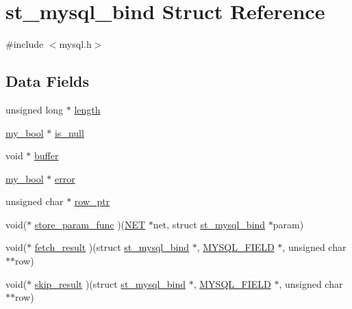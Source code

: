 \hypertarget{structst__mysql__bind}{}\section{st\+\_\+mysql\+\_\+bind Struct Reference}
\label{structst__mysql__bind}


{\ttfamily \#include $<$mysql.\+h$>$}

\subsection*{Data Fields}
\begin{DoxyCompactItemize}
\item 
unsigned long $\ast$ \hyperlink{structst__mysql__bind_a255c7b483665c1d98aaf73606e72cfca}{length}
\item 
\hyperlink{mysql_8h_a74cd599039dcf29c6e6d342cf4efd0a8}{my\+\_\+bool} $\ast$ \hyperlink{structst__mysql__bind_a04defa2229677eefb0b50ed902358ef5}{is\+\_\+null}
\item 
void $\ast$ \hyperlink{structst__mysql__bind_a3ea4a5256c2e8c8f7b80ceea0ed5d3bb}{buffer}
\item 
\hyperlink{mysql_8h_a74cd599039dcf29c6e6d342cf4efd0a8}{my\+\_\+bool} $\ast$ \hyperlink{structst__mysql__bind_a555fb0921bc7a50e54c863b702a75259}{error}
\item 
unsigned char $\ast$ \hyperlink{structst__mysql__bind_a78b2414892e0e1af294bbf773dce201e}{row\+\_\+ptr}
\item 
void($\ast$ \hyperlink{structst__mysql__bind_ae7494004e650d528427e906727c22337}{store\+\_\+param\+\_\+func} )(\hyperlink{mysql__com_8h_a6869c9fe9e26bbedea92d6603825d482}{N\+E\+T} $\ast$net, struct \hyperlink{structst__mysql__bind}{st\+\_\+mysql\+\_\+bind} $\ast$param)
\item 
void($\ast$ \hyperlink{structst__mysql__bind_a1398006bc3b49e8a61084188976929ae}{fetch\+\_\+result} )(struct \hyperlink{structst__mysql__bind}{st\+\_\+mysql\+\_\+bind} $\ast$, \hyperlink{mysql_8h_ad010774d7ae34dc28a2e044ed2cd4f71}{M\+Y\+S\+Q\+L\+\_\+\+F\+I\+E\+L\+D} $\ast$, unsigned char $\ast$$\ast$row)
\item 
void($\ast$ \hyperlink{structst__mysql__bind_a5d9670e2a4c8dcc91f3d6b21fbc33e75}{skip\+\_\+result} )(struct \hyperlink{structst__mysql__bind}{st\+\_\+mysql\+\_\+bind} $\ast$, \hyperlink{mysql_8h_ad010774d7ae34dc28a2e044ed2cd4f71}{M\+Y\+S\+Q\+L\+\_\+\+F\+I\+E\+L\+D} $\ast$, unsigned char $\ast$$\ast$row)
\item 

\end{DoxyCompactItemize}
